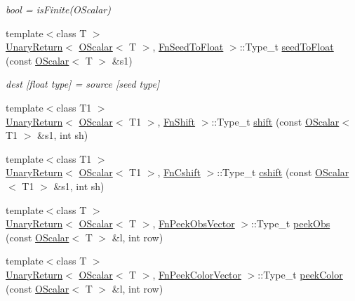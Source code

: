 \begin{DoxyCompactItemize}
\begin{DoxyCompactList}\small\item\em bool = is\+Finite(\+O\+Scalar) \end{DoxyCompactList}\item 
{\footnotesize template$<$class T $>$ }\\\mbox{\hyperlink{structENSEM_1_1UnaryReturn}{Unary\+Return}}$<$ \mbox{\hyperlink{classENSEM_1_1OScalar}{O\+Scalar}}$<$ T $>$, \mbox{\hyperlink{structENSEM_1_1FnSeedToFloat}{Fn\+Seed\+To\+Float}} $>$\+::Type\+\_\+t \mbox{\hyperlink{group__obsscalar_gad5154b123a75f53178134d8518242639}{seed\+To\+Float}} (const \mbox{\hyperlink{classENSEM_1_1OScalar}{O\+Scalar}}$<$ T $>$ \&s1)
\begin{DoxyCompactList}\small\item\em dest \mbox{[}float type\mbox{]} = source \mbox{[}seed type\mbox{]} \end{DoxyCompactList}\item 
{\footnotesize template$<$class T1 $>$ }\\\mbox{\hyperlink{structENSEM_1_1UnaryReturn}{Unary\+Return}}$<$ \mbox{\hyperlink{classENSEM_1_1OScalar}{O\+Scalar}}$<$ T1 $>$, \mbox{\hyperlink{structENSEM_1_1FnShift}{Fn\+Shift}} $>$\+::Type\+\_\+t \mbox{\hyperlink{group__obsscalar_ga2baf234651cfec54ad620a11e79d6ac6}{shift}} (const \mbox{\hyperlink{classENSEM_1_1OScalar}{O\+Scalar}}$<$ T1 $>$ \&s1, int sh)
\item 
{\footnotesize template$<$class T1 $>$ }\\\mbox{\hyperlink{structENSEM_1_1UnaryReturn}{Unary\+Return}}$<$ \mbox{\hyperlink{classENSEM_1_1OScalar}{O\+Scalar}}$<$ T1 $>$, \mbox{\hyperlink{structENSEM_1_1FnCshift}{Fn\+Cshift}} $>$\+::Type\+\_\+t \mbox{\hyperlink{group__obsscalar_ga6e281512474808f7e211836b3d6607f3}{cshift}} (const \mbox{\hyperlink{classENSEM_1_1OScalar}{O\+Scalar}}$<$ T1 $>$ \&s1, int sh)
\item 
{\footnotesize template$<$class T $>$ }\\\mbox{\hyperlink{structENSEM_1_1UnaryReturn}{Unary\+Return}}$<$ \mbox{\hyperlink{classENSEM_1_1OScalar}{O\+Scalar}}$<$ T $>$, \mbox{\hyperlink{structENSEM_1_1FnPeekObsVector}{Fn\+Peek\+Obs\+Vector}} $>$\+::Type\+\_\+t \mbox{\hyperlink{group__obsscalar_ga39239dd32aa731cde63bf4ecdafd30a4}{peek\+Obs}} (const \mbox{\hyperlink{classENSEM_1_1OScalar}{O\+Scalar}}$<$ T $>$ \&l, int row)
\item 
{\footnotesize template$<$class T $>$ }\\\mbox{\hyperlink{structENSEM_1_1UnaryReturn}{Unary\+Return}}$<$ \mbox{\hyperlink{classENSEM_1_1OScalar}{O\+Scalar}}$<$ T $>$, \mbox{\hyperlink{structENSEM_1_1FnPeekColorVector}{Fn\+Peek\+Color\+Vector}} $>$\+::Type\+\_\+t \mbox{\hyperlink{group__obsscalar_ga8f3e69e2d0f4a46a99f719e70d6a13d8}{peek\+Color}} (const \mbox{\hyperlink{classENSEM_1_1OScalar}{O\+Scalar}}$<$ T $>$ \&l, int row)

\end{DoxyCompactItemize}
